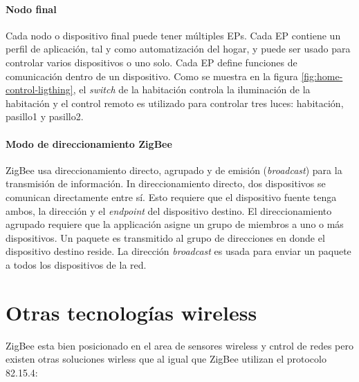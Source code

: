 \documentclass[10pt,journal,compsoc]{IEEEtran}
\begin{document}
\paragraph{Nodo final} Cada nodo o dispositivo final puede tener múltiples EPs. Cada EP contiene un perfil de aplicación, tal y como automatización del hogar, y puede ser usado para controlar varios dispositivos o uno solo. Cada EP define funciones de comunicación dentro de un dispositivo. Como se muestra en la figura \ref{fig:home-control-ligthing}, el \emph{switch} de la habitación controla la iluminación de la habitación y el control remoto es utilizado para controlar tres luces: habitación, pasillo1 y pasillo2.

\paragraph{Modo de direccionamiento ZigBee}
ZigBee usa direccionamiento directo, agrupado y de emisión (\emph{broadcast}) para la transmisión de información. In direccionamiento directo, dos dispositivos se comunican directamente entre sí. Esto requiere que el dispositivo fuente tenga ambos, la dirección y el \emph{endpoint} del dispositivo destino. El direccionamiento agrupado requiere que la applicación asigne un grupo de miembros a uno o más dispositivos. Un paquete es transmitido al grupo de direcciones en donde el dispositivo destino reside. La dirección \emph{broadcast} es usada para enviar un paquete a todos los dispositivos de la red. 


%
%

\section{Otras tecnologías wireless}
ZigBee esta bien posicionado en el area de sensores wireless y cntrol de redes pero existen otras soluciones wirless que al igual que ZigBee utilizan el protocolo 82.15.4:
\end{document}
